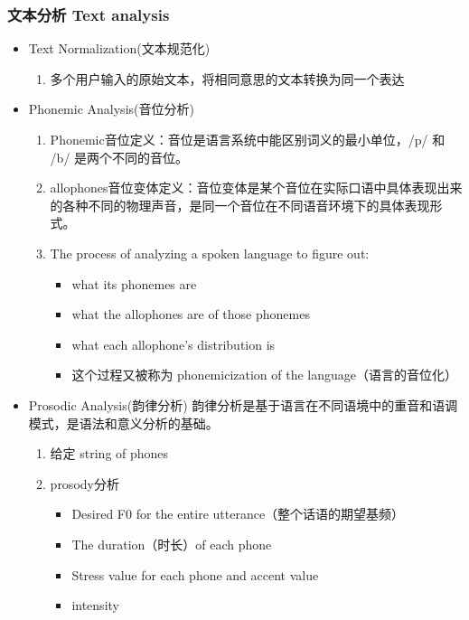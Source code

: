 \documentclass[UTF8]{ctexart}
\begin{document}
\subsubsection{文本分析 Text analysis}
\begin{itemize}
    \item Text Normalization(文本规范化)
    \begin{enumerate}
        \item 多个用户输入的原始文本，将相同意思的文本转换为同一个表达
    \end{enumerate}
    \item Phonemic Analysis(音位分析)
    \begin{enumerate}
        \item Phonemic音位定义：音位是语言系统中能区别词义的最小单位，/p/ 和 /b/ 是两个不同的音位。
        \item allophones音位变体定义：音位变体是某个音位在实际口语中具体表现出来的各种不同的物理声音，是同一个音位在不同语音环境下的具体表现形式。
        \item The process of analyzing a spoken language to figure out:
        \begin{itemize}
            \item what its phonemes are
            \item what the allophones are of those phonemes
            \item what each allophone's distribution is
            \item 这个过程又被称为 phonemicization of the language（语言的音位化）
        \end{itemize}
    \end{enumerate}
    \item Prosodic Analysis(韵律分析)
    韵律分析是基于语言在不同语境中的重音和语调模式，是语法和意义分析的基础。
    \begin{enumerate}
        \item 给定 string of phones
        \item prosody分析
        \begin{itemize}
            \item Desired F0 for the entire utterance（整个话语的期望基频）
            \item The duration（时长）of each phone
            \item Stress value for each phone and accent value
            \item intensity
        \end{itemize}
    \end{enumerate}
\end{itemize}
\end{document}

